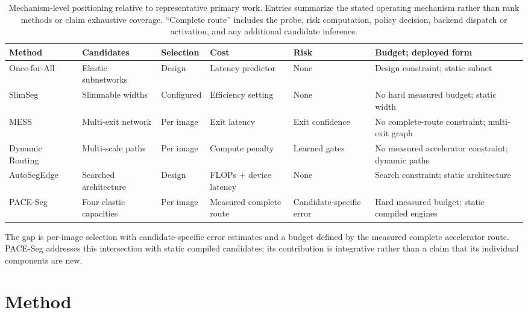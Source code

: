 \documentclass[a4paper,review,12pt]{elsarticle}
\newcommand{\method}{PACE-Seg}
\begin{document}
\begin{table}[H]
\centering
\caption{Mechanism-level positioning relative to representative primary work. Entries summarize the stated operating mechanism rather than rank methods or claim exhaustive coverage. ``Complete route'' includes the probe, risk computation, policy decision, backend dispatch or activation, and any additional candidate inference.}
\label{tab:related-positioning}
\scriptsize
\setlength{\tabcolsep}{1.4pt}
\renewcommand{\arraystretch}{1.08}
\begin{tabular}{@{}>{\raggedright\arraybackslash}p{2.3cm}>{\raggedright\arraybackslash}p{2.0cm}>{\raggedright\arraybackslash}p{1.45cm}>{\raggedright\arraybackslash}p{2.1cm}>{\raggedright\arraybackslash}p{2.0cm}>{\raggedright\arraybackslash}p{3.35cm}@{}}
\toprule
Method & Candidates & Selection & Cost & Risk & Budget; deployed form \\
\midrule
Once-for-All~\cite{cai2020ofa} & Elastic subnetworks & Design & Latency predictor & None & Design constraint; static subnet \\
SlimSeg~\cite{xue2022slimseg} & Slimmable widths & Configured & Efficiency setting & None & No hard measured budget; static width \\
MESS~\cite{kouris2022mess} & Multi-exit network & Per image & Exit latency & Exit confidence & No complete-route constraint; multi-exit graph \\
Dynamic Routing~\cite{li2020dynamic} & Multi-scale paths & Per image & Compute penalty & Learned gates & No measured accelerator constraint; dynamic paths \\
AutoSegEdge~\cite{dou2023autosegedge} & Searched architecture & Design & FLOPs + device latency & None & Search constraint; static architecture \\
\method{} & Four elastic capacities & Per image & Measured complete route & Candidate-specific error & Hard measured budget; static compiled engines \\
\bottomrule
\end{tabular}
\end{table}

The gap is per-image selection with candidate-specific error estimates and a budget defined by the measured complete accelerator route. \method{} addresses this intersection with static compiled candidates; its contribution is integrative rather than a claim that its individual components are new.

\section{Method}
\label{sec:method}
\end{document}
